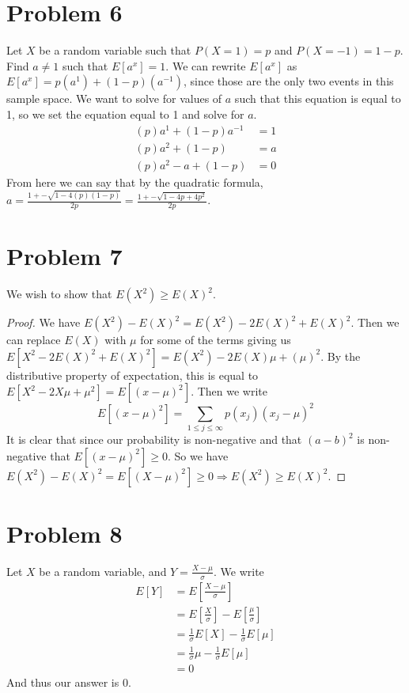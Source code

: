 \documentclass{article}
\begin{document}
\section*{Problem 6}
    Let $X$ be a random variable such that $P(X = 1) = p$ and $P(X = -1) = 1 - p$. Find $a \neq 1$ such that $E[a^x] = 1$.
    We can rewrite $E[a^x]$ as $E[a^x] = p(a^1) + (1-p)(a^{-1})$, since those are the only two events in this sample space.
    We want to solve for values of $a$ such that this equation is equal to 1,
    so we set the equation equal to 1 and solve for $a$.
    \begin{align*}
        (p)a^1 + (1-p)a^{-1} & = 1 \\
        (p)a^2 + (1-p) & = a \\
        (p)a^2 - a + (1-p) & = 0
    \end{align*}
    From here we can say that by the quadratic formula, $a = \frac{1 +- \sqrt{1 - 4(p)(1-p)}}{2p} = \frac{1+-\sqrt{1-4p+4p^2}}{2p}$.
\section*{Problem 7}
    We wish to show that $E(X^2) \geq E(X)^2$.
    \begin{proof}
        We have $E(X^2) - E(X)^2 = E(X^2) - 2E(X)^2 + E(X)^2$.
        Then we can replace $E(X)$ with $\mu$ for some of the terms giving us $E[X^2 - 2E(X)^2 + E(X)^2] = E(X^2) - 2E(X) \mu + (\mu)^2$.
        By the distributive property of expectation, this is equal to $E[X^2-2X\mu + \mu^2] = E[(x-\mu)^2]$.
        Then we write
        \[
            E[(x-\mu)^2] = \sum_{1 \leq j \leq \infty}p(x_j)(x_j - \mu)^2
        \]
        It is clear that since our probability is non-negative and that $(a-b)^2$ is non-negative that $E[(x - \mu)^2] \geqslant 0$.
        So we have $E(X^2) - E(X)^2 = E[(X - \mu)^2] \geqslant 0 \Longrightarrow E(X^2) \geqslant E(X)^2$.
    \end{proof}
\section*{Problem 8}
    Let $X$ be a random variable, and $Y = \frac{X - \mu}{\sigma}$.
    We write
    \begin{align*}
        E[Y] &= E[\frac{X -\mu}{\sigma}]\\
        &=E[\frac{X}{\sigma}] - E[\frac{\mu}{\sigma}]\\
        &=\frac{1}{\sigma}E[X] - \frac{1}{\sigma}E[\mu]\\
        &=\frac{1}{\sigma}\mu - \frac{1}{\sigma}E[\mu]\\
        &= 0
    \end{align*}
    And thus our answer is 0.
\end{document}
